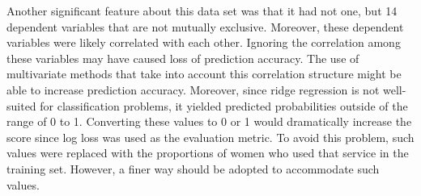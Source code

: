 \documentclass{article}\usepackage[]{graphicx}\usepackage[]{color}
\begin{document}
                                                                                                                                                                                                                                                                                                                                                                                                                                                                                                                                                                                                Another significant feature about this data set was that it had not one, but 14 dependent variables that are not mutually exclusive. Moreover, these dependent variables were likely correlated with each other. Ignoring the correlation among these variables may have caused loss of prediction accuracy. The use of multivariate methods that take into account this correlation structure might be able to increase prediction accuracy.                                                                                                                                                                                                                                                                                                                                                                                                                                                                                                                                             
                                                                                                                                                                                                                                                                                                                                                                                                                                                                                                                                                                                                Moreover, since ridge regression is not well-suited for classification problems, it yielded predicted probabilities outside of the range of 0 to 1. Converting these values to 0 or 1 would dramatically increase the score since log loss was used as the evaluation metric. To avoid this problem, such values were replaced with the proportions of women who used that service in the training set. However, a finer way should be adopted to accommodate such values.
\end{document}
